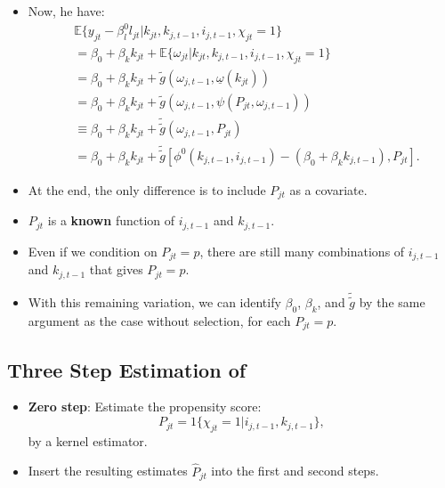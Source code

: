 \documentclass[
]{book}
\providecommand{\tightlist}{%
  \setlength{\itemsep}{0pt}\setlength{\parskip}{0pt}}
\begin{document}
\begin{itemize}
\tightlist
\item
  Now, he have:
  \begin{equation}
  \begin{split}
  &\mathbb{E}\{y_{jt} - \beta_l^0 l_{jt}|k_{jt}, k_{j, t - 1}, i_{j, t - 1}, \chi_{jt} = 1\} \\
  &= \beta_0 + \beta_k k_{jt} + \mathbb{E}\{\omega_{jt}| k_{jt}, k_{j, t - 1}, i_{j, t - 1} , \chi_{jt} = 1\}\\
  &= \beta_0 + \beta_k k_{jt} + \tilde{g}(\omega_{j, t - 1}, \underline{\omega}(k_{jt}))\\
  &= \beta_0 + \beta_k k_{jt} + \tilde{g}(\omega_{j, t - 1}, \psi(P_{jt}, \omega_{j, t - 1}))\\
  &\equiv \beta_0 + \beta_k k_{jt} + \tilde{\tilde{g}}(\omega_{j, t - 1}, P_{jt})\\
  &= \beta_0 + \beta_k k_{jt} + \tilde{\tilde{g}}[\phi^0(k_{j, t - 1}, i_{j, t - 1}) - (\beta_0 + \beta_k k_{j, t - 1}), P_{jt}].
  \end{split}
  \end{equation}
\item
  At the end, the only difference is to include \(P_{jt}\) as a covariate.
\item
  \(P_{jt}\) is a \textbf{known} function of \(i_{j, t - 1}\) and \(k_{j, t - 1}\).
\item
  Even if we condition on \(P_{jt} = p\), there are still many combinations of \(i_{j, t - 1}\) and \(k_{j, t - 1}\) that gives \(P_{jt} = p\).
\item
  With this remaining variation, we can identify \(\beta_0\), \(\beta_k\), and \(\tilde{\tilde{g}}\) by the same argument as the case without selection, for each \(P_{jt} = p\).
\end{itemize}

\hypertarget{three-step-estimation-of-olley1996}{%
\subsection{\texorpdfstring{Three Step Estimation of \citet{Olley1996}}{Three Step Estimation of @Olley1996}}\label{three-step-estimation-of-olley1996}}

\begin{itemize}
\tightlist
\item
  \textbf{Zero step}: Estimate the propensity score:
  \begin{equation}
  P_{jt} = 1\{\chi_{jt} = 1| i_{j, t - 1}, k_{j, t - 1}\},
  \end{equation}
  by a kernel estimator.
\item
  Insert the resulting estimates \(\widehat{P}_{jt}\) into the first and second steps.
\end{itemize}
\end{document}
